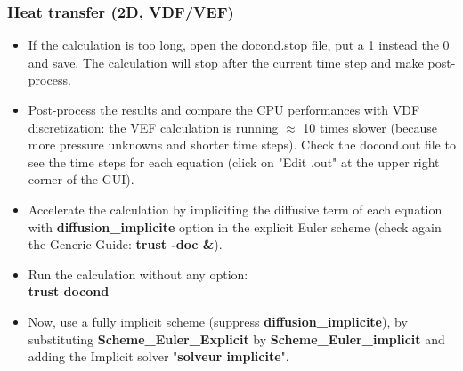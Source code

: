 \documentclass[10pt, hyperref={unicode=true,pdfusetitle, bookmarks=true,bookmarksnumbered=false,bookmarksopen=false, breaklinks=false,pdfborder={0 0 1},backref=true,colorlinks=true,linkcolor=darkblue,pageanchor}]{beamer}
\begin{document}
\begin{frame}
\frametitle{Heat transfer (2D, VDF/VEF)}
\begin{block}{}

\begin{itemize}
\item If the calculation is too long, open the docond.stop file, put a 1 instead the 0 and save.
The calculation will stop after the current time step and make post-process.

\item Post-process the results and compare the CPU performances with VDF discretization: the VEF calculation is running $\approx$ 10 times slower (because more pressure unknowns and shorter time steps). Check the docond.out file to see the time steps for each equation (click on "Edit .out" at the upper right corner of the GUI).

\item Accelerate the calculation by impliciting the diffusive term of each equation with \textbf{diffusion\_implicite} option in the explicit Euler scheme (check again the Generic Guide: \textbf{trust -doc \&}). 

\item Run the calculation without any option: \\
\textbf{trust docond}

\item \label{schema_impl} Now, use a fully implicit scheme (suppress \textbf{diffusion\_implicite}), by substituting \textbf{Scheme\_Euler\_Explicit} by \textbf{Scheme\_Euler\_implicit} and adding the Implicit solver "\textbf{solveur implicite}".

\end{itemize}

\end{block}
\end{frame}
\end{document}
